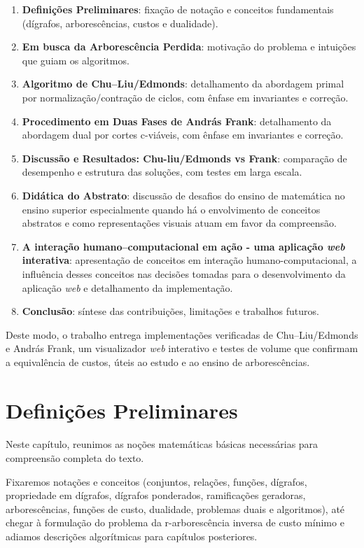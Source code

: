 \documentclass[12pt,a4paper]{article}
\begin{document}
\begin{enumerate}
    \item \textbf{Definições Preliminares}: fixação de notação e conceitos fundamentais (dígrafos, arborescências, custos e dualidade).
    \item \textbf{Em busca da Arborescência Perdida}: motivação do problema e intuições que guiam os algoritmos.
    \item \textbf{Algoritmo de Chu--Liu/Edmonds}: detalhamento da abordagem primal por normalização/contração de ciclos, com ênfase em invariantes e correção.
    \item \textbf{Procedimento em Duas Fases de András Frank}: detalhamento da abordagem dual por cortes c-viáveis, com ênfase em invariantes e correção.
    \item \textbf{Discussão e Resultados: Chu-liu/Edmonds vs Frank}: comparação de desempenho e estrutura das soluções, com testes em larga escala.
    \item \textbf{Didática do Abstrato}: discussão de desafios do ensino de matemática no ensino superior especialmente quando há o envolvimento de conceitos abstratos e como representações visuais atuam em favor da compreensão.
    \item \textbf{A interação humano--computacional em ação - uma aplicação \textit{web} interativa}: apresentação de conceitos em interação humano-computacional, a influência desses conceitos nas decisões tomadas para o desenvolvimento da aplicação \textit{web} e detalhamento da implementação.
    \item \textbf{Conclusão}: síntese das contribuições, limitações e trabalhos futuros.
\end{enumerate}

Deste modo, o trabalho entrega implementações verificadas de Chu--Liu/Edmonds e András Frank, um visualizador \textit{web} interativo e testes de volume que confirmam a equivalência de custos, úteis ao estudo e ao ensino de arborescências.

\section{Definições Preliminares}
\paragraph{}
Neste capítulo, reunimos as noções matemáticas básicas necessárias para compreensão completa do texto.

Fixaremos notações e conceitos (conjuntos, relações, funções, dígrafos, propriedade em dígrafos, dígrafos ponderados, ramificações geradoras, arborescências, funções de custo, dualidade, problemas duais e algoritmos), até chegar à formulação do problema da r-arborescência inversa de custo mínimo e adiamos descrições algorítmicas para capítulos posteriores.
\end{document}
